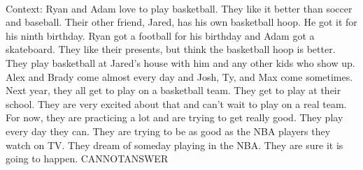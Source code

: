 \documentclass[11pt,a4paper, onecolumn]{article}
\begin{document}
\\ Context: Ryan and Adam love to play basketball. They like it better than soccer and baseball. Their other friend, Jared, has his own basketball hoop. He got it for his ninth birthday. Ryan got a football for his birthday and Adam got a skateboard. They like their presents, but think the basketball hoop is better. They play basketball at Jared's house with him and any other kids who show up. Alex and Brady come almost every day and Josh, Ty, and Max come sometimes. Next year, they all get to play on a basketball team. They get to play at their school. They are very excited about that and can't wait to play on a real team. For now, they are practicing a lot and are trying to get really good. They play every day they can. They are trying to be as good as the NBA players they watch on TV. They dream of someday playing in the NBA. They are sure it is going to happen. CANNOTANSWER
\end{document}
